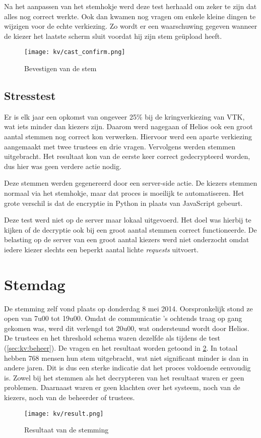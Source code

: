 \npar Na het aanpassen van het stemhokje werd deze test herhaald om zeker te zijn dat alles nog correct werkte. Ook dan kwamen nog vragen om enkele kleine dingen te wijzigen voor de echte verkiezing. Zo wordt er een waarschuwing gegeven wanneer de kiezer het laatste scherm sluit voordat hij zijn stem ge\"upload heeft.

\begin{figure}
  \centering
  \texttt{[image: kv/cast\_confirm.png]}
  \caption{Bevestigen van de stem}
  \label{fig:kv:cast_confirm}
\end{figure}

\subsection{Stresstest}

Er is elk jaar een opkomst van ongeveer 25\% bij de kringverkiezing van VTK, wat iets minder dan  kiezers zijn. Daarom werd nagegaan of Helios ook een groot aantal stemmen nog correct kon verwerken. Hiervoor werd een aparte verkiezing aangemaakt met twee trustees en drie vragen. Vervolgens werden  stemmen uitgebracht. Het resultaat kon van de eerste keer correct gedecrypteerd worden, dus hier was geen verdere actie nodig.

\npar Deze stemmen werden gegenereerd door een server-side actie. De kiezers stemmen normaal via het stemhokje, maar dat proces is moeilijk te automatiseren. Het grote verschil is dat de encryptie in Python in plaats van JavaScript gebeurt.

\npar Deze test werd niet op de server maar lokaal uitgevoerd. Het doel was hierbij te kijken of de  decryptie ook bij een groot aantal stemmen correct functioneerde. De belasting op de server van een groot aantal kiezers werd niet onderzocht omdat iedere kiezer slechts een beperkt aantal lichte \textit{requests} uitvoert.

\section{Stemdag}
\label{sec:kv:stemdag}

\npar De stemming zelf vond plaats op donderdag 8 mei 2014. Oorspronkelijk stond ze open van 7u00 tot 19u00. Omdat de communicatie 's ochtends traag op gang gekomen was, werd dit verlengd tot 20u00, wat ondersteund wordt door Helios. De trustees en het threshold schema waren dezelfde als tijdens de test (\ref{sec:kv:beheer}). De vragen en het resultaat worden getoond in \ref{fig:kv:result}. In totaal hebben 768 mensen hun stem uitgebracht, wat niet significant minder is dan in andere jaren. Dit is dus een sterke indicatie dat het proces voldoende eenvoudig is. Zowel bij het stemmen als het decrypteren van het resultaat waren er geen problemen. Daarnaast waren er geen klachten over het systeem, noch van de kiezers, noch van de beheerder of trustees.

\begin{figure}
  \centering
  \texttt{[image: kv/result.png]}
  \caption{Resultaat van de stemming}
  \label{fig:kv:result}
\end{figure}